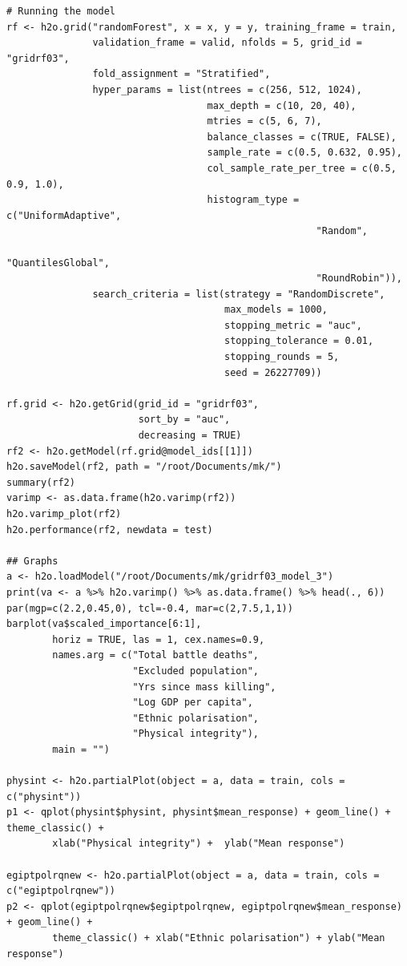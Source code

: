 \begin{verbatim}
# Running the model
rf <- h2o.grid("randomForest", x = x, y = y, training_frame = train, 
               validation_frame = valid, nfolds = 5, grid_id = "gridrf03",
               fold_assignment = "Stratified",
               hyper_params = list(ntrees = c(256, 512, 1024),
                                   max_depth = c(10, 20, 40),
                                   mtries = c(5, 6, 7),
                                   balance_classes = c(TRUE, FALSE),
                                   sample_rate = c(0.5, 0.632, 0.95),
                                   col_sample_rate_per_tree = c(0.5, 0.9, 1.0),
                                   histogram_type = c("UniformAdaptive",
                                                      "Random",
                                                      "QuantilesGlobal",
                                                      "RoundRobin")),
               search_criteria = list(strategy = "RandomDiscrete", 
                                      max_models = 1000, 
                                      stopping_metric = "auc", 
                                      stopping_tolerance = 0.01, 
                                      stopping_rounds = 5, 
                                      seed = 26227709)) 

rf.grid <- h2o.getGrid(grid_id = "gridrf03",
                       sort_by = "auc",
                       decreasing = TRUE)
rf2 <- h2o.getModel(rf.grid@model_ids[[1]])
h2o.saveModel(rf2, path = "/root/Documents/mk/")
summary(rf2)
varimp <- as.data.frame(h2o.varimp(rf2))
h2o.varimp_plot(rf2)
h2o.performance(rf2, newdata = test)

## Graphs
a <- h2o.loadModel("/root/Documents/mk/gridrf03_model_3")
print(va <- a %>% h2o.varimp() %>% as.data.frame() %>% head(., 6)) 
par(mgp=c(2.2,0.45,0), tcl=-0.4, mar=c(2,7.5,1,1))
barplot(va$scaled_importance[6:1],
        horiz = TRUE, las = 1, cex.names=0.9,
        names.arg = c("Total battle deaths", 
                      "Excluded population",
                      "Yrs since mass killing",
                      "Log GDP per capita",
                      "Ethnic polarisation",
                      "Physical integrity"),
        main = "")

physint <- h2o.partialPlot(object = a, data = train, cols = c("physint"))
p1 <- qplot(physint$physint, physint$mean_response) + geom_line() + theme_classic() + 
        xlab("Physical integrity") +  ylab("Mean response")

egiptpolrqnew <- h2o.partialPlot(object = a, data = train, cols = c("egiptpolrqnew"))
p2 <- qplot(egiptpolrqnew$egiptpolrqnew, egiptpolrqnew$mean_response) + geom_line() +
        theme_classic() + xlab("Ethnic polarisation") + ylab("Mean response")


\end{verbatim}
